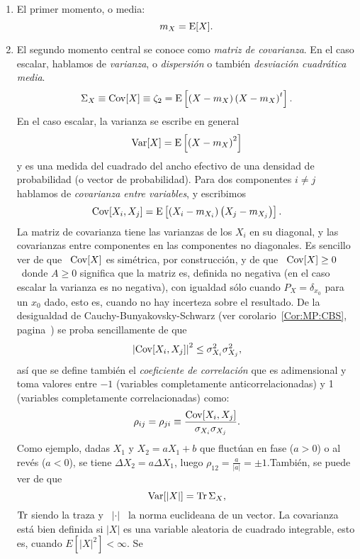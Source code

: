 \begin{itemize}
  \begin{enumerate}
  \item El primer momento, o media:
   \[
    m_X = \operatorname{E}[X].
   \]
 \item El segundo momento central se conoce como {\it matriz de covarianza}.  En
   el caso escalar, hablamos de {\it varianza}, o {\it dispersi\'on} o tambi\'en
   {\it desviaci\'on cuadr\'atica media}.
  \[
  \Sigma_X \equiv  \operatorname{Cov}[X] \equiv  \zeta_2 = \operatorname{E}\left[  \left( X -  m_X \right)
    \left( X - m_X \right)^t \right].
  \]
  En el caso escalar, la varianza se escribe en general
  \[
  \operatorname{Var}[X] = \operatorname{E}\left[ \left( X  - m_X \right)^2 \right]
  \]
  y  es  una  medida  del  cuadrado  del  ancho  efectivo  de  una  densidad  de
  probabilidad  (o vector  de  probabilidad).  Para dos  componentes  $i \ne  j$
  hablamos de {\it covarianza entre variables}, y escribimos
  \[
  \operatorname{Cov}[X_i,X_j]  =  \operatorname{E}\left[ \left(  X_i  -  m_{X_i}  \right) \left(  X_j  -
      m_{X_j} \right) \right].
  \]
  La matriz de covarianza tiene las varianzas de los $X_i$ en su diagonal, y las
  covarianzas entre  componentes en las componentes no  diagonales.  Es sencillo
  ver de que \ $\operatorname{Cov}[X]$ es sim\'etrica, por construcci\'on, y de que \ $\operatorname{Cov}[X]
  \ge 0$ \ donde $A \ge 0$  significa que la matriz es, definida no negativa (en
  el caso escalar la varianza es no negativa), con igualdad s\'olo cuando $P_X =
  \delta_{x_0}$ para  un $x_0$ dado, esto  es, cuando no hay  incerteza sobre el
  resultado.    De    la   desigualdad   de    Cauchy-Bunyakovsky-Schwarz   (ver
  corolario~\ref{Cor:MP:CBS},      pagina~\pageref{Cor:MP:CBS})     se     proba
  sencillamente  de  que
  \[
  \left| \operatorname{Cov}[X_i,X_j] \right|^2 \le \sigma_{X_i}^2 \sigma_{X_j}^2,
  \]
  as\'i que  se define  tambi\'en el {\it  coeficiente de correlaci\'on}  que es
  adimensional   y   toma    valores   entre   $-1$   (variables   completamente
  anticorrelacionadas) y 1 (variables completamente correlacionadas) como:
  \[
  \rho_{ij} = \rho_{ji} \equiv \frac{\operatorname{Cov}[X_i,X_j]}{\sigma_{X_i} \sigma_{X_j}}.
  \]
  Como ejemplo, dadas $X_1$ y $X_2 = a X_1 + b$ que fluct\'uan en fase ($a>0$) o
  al rev\'es ($a<0$),  se tiene $\Delta X_2 = a \Delta  X_1$, luego $\rho_{12} =
  \frac{a}{|a|} = \pm  1$.\newline Tambi\'en, se puede ver  de que \[\operatorname{Var}[|X|] =
  \operatorname{Tr} \Sigma_X,\] $\operatorname{Tr}$  siendo la traza y \ $|\cdot|$ \  la norma euclideana de
  un  vector.  La  covarianza  est\'a bien  definida  si $|X|$  es una  variable
  aleatoria de  cuadrado integrable,  esto es, cuando  $E[|X|^2] <  \infty$.  Se

\end{enumerate}
\end{itemize}
